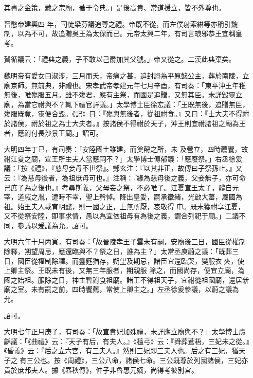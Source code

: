 \begin{pinyinscope}
 其書之金策，藏之宗廟，著于令典。」是後高貴、常道援立，皆不外尊也。



 晉愍帝建興四
 年，司徒梁芬議追尊之禮。帝既不從，而左僕射索綝等亦稱引魏制，以為不可，故追贈吳王為太保而已。元帝太興二年，有司言琅邪恭王宜稱皇考。



 賀循議云：「禮典之義，子不敢以己爵加其父號。」帝又從之。二漢此典棄矣。



 魏明帝有愛女曰淑涉，三月而夭，帝痛之甚，追封謚為平原懿公主，葬於南陵，立廟京師。無前典，非禮也。宋孝武帝孝建元年七月辛酉，有司奏：「東平沖王年稚
 無後，唯殤服五月。雖不殤君，應有主祭，而國是追贈，又無其臣。未詳毀靈立廟，為當它祔與不？輒下禮官詳議。」太學博士臣徐宏議：「王既無後，追贈無臣，殤服既竟，靈便合毀。《記》曰：『殤與無後者，從祖祔食。』又曰：『士大夫不得祔於諸侯，祔於祖之為士大夫者。』按諸侯不得祔於天子，沖王則宜祔諸祖之廟為王者，應祔付長沙景王廟。」詔可。



 大明四年丁巳，有司奏：「安陸國土雖建，而奠酹之所，未
 及營立，四時薦饗，故祔江夏之廟，宣王所生夫人當應祠不？」太學博士傅郁議：「應廢祭。」右丞徐爰議：「按《禮》，『慈母妾母不世祭』。鄭玄注：『以其非正，故傳曰子祭孫止。』又云：『為慈母後者，為祖庶母可也。』注稱：『緣為慈母後之義，父妾無子，亦可命己庶子為之後也。』考尋斯義，父母妾之祭，不必唯子。江夏宣王太子，體自元宰，道戚之胤，遭時不幸，聖上矜悼。降出皇愛，嗣承徽緒，光啟大蕃，屬國為祖。始王夫人載育明懿，則一國之正，上無所厭，哀敬得
 申。既未獲祔享江夏，又不從祭安陸，即事求情，愚以為宜依祖母有為後之義，謂合列祀于廟。」二議不同，參議以爰議為允。詔可。



 大明六年十月丙寅，有司奏：「故晉陵孝王子雲未有嗣，安廟後三日，國臣從權制除釋，朔望周忌，應還臨與不？祭之日，誰為主？」太常丞庾蔚之議：「既葬三日，國臣從權制除釋。而靈筵猶存，朔望及期忌，諸臣宜還臨哭，變服衣夾，使上卿主祭。王既未有後，又無三年服者，期親服
 除之，而國尚存，便宜立廟，為國之始祖。服除之日，神主暫祔食祖廟。諸王不得祖天子，宜祔從祖國廟，還居新廟之室。未有嗣之前，四時饗薦，常使上卿主之。」左丞徐爰參議，以蔚之議為允。



 詔可。



 大明七年正月庚子，有司奏：「故宣貴妃加殊禮，未詳應立廟與不？」太學博士虞龢議：「《曲禮》云：『天子有后，有夫人。』《檀弓》云：『舜葬蒼梧，三妃未之從。』《昏義》云：『后之立六宮，有三夫人。』然則三妃即三夫人也。后之有三妃，猶天子之
 有三公也。按《周禮》，三公八命，諸侯七命。三公既尊於列國諸侯，三妃亦貴於庶邦夫人。據《春秋傳》，仲子非魯惠元嫡，尚得考彼別宮。




\end{pinyinscope}

